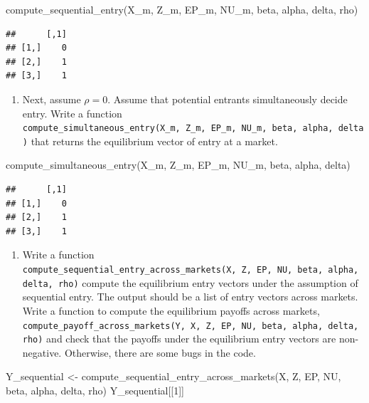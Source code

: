 \documentclass[
]{book}
\newenvironment{Shaded}{\begin{snugshade}}{\end{snugshade}}
\newcommand{\DecValTok}[1]{\textcolor[rgb]{0.00,0.00,0.81}{#1}}
\newcommand{\FunctionTok}[1]{\textcolor[rgb]{0.00,0.00,0.00}{#1}}
\newcommand{\NormalTok}[1]{#1}
\newcommand{\OtherTok}[1]{\textcolor[rgb]{0.56,0.35,0.01}{#1}}
\providecommand{\tightlist}{%
  \setlength{\itemsep}{0pt}\setlength{\parskip}{0pt}}
\begin{document}
\begin{Shaded}
\begin{Highlighting}[]
\FunctionTok{compute\_sequential\_entry}\NormalTok{(X\_m, Z\_m, EP\_m, NU\_m, beta, alpha, delta, rho)}
\end{Highlighting}
\end{Shaded}

\begin{verbatim}
##      [,1]
## [1,]    0
## [2,]    1
## [3,]    1
\end{verbatim}

\begin{enumerate}
\def\labelenumi{\arabic{enumi}.}
\setcounter{enumi}{5}
\tightlist
\item
  Next, assume \(\rho = 0\). Assume that potential entrants simultaneously decide entry. Write a function \texttt{compute\_simultaneous\_entry(X\_m,\ Z\_m,\ EP\_m,\ NU\_m,\ beta,\ alpha,\ delta)} that returns the equilibrium vector of entry at a market.
\end{enumerate}

\begin{Shaded}
\begin{Highlighting}[]
\FunctionTok{compute\_simultaneous\_entry}\NormalTok{(X\_m, Z\_m, EP\_m, NU\_m, beta, alpha, delta)}
\end{Highlighting}
\end{Shaded}

\begin{verbatim}
##      [,1]
## [1,]    0
## [2,]    1
## [3,]    1
\end{verbatim}

\begin{enumerate}
\def\labelenumi{\arabic{enumi}.}
\setcounter{enumi}{6}
\tightlist
\item
  Write a function \texttt{compute\_sequential\_entry\_across\_markets(X,\ Z,\ EP,\ NU,\ beta,\ alpha,\ delta,\ rho)} compute the equilibrium entry vectors under the assumption of sequential entry. The output should be a list of entry vectors across markets. Write a function to compute the equilibrium payoffs across markets, \texttt{compute\_payoff\_across\_markets(Y,\ X,\ Z,\ EP,\ NU,\ beta,\ alpha,\ delta,\ rho)} and check that the payoffs under the equilibrium entry vectors are non-negative. Otherwise, there are some bugs in the code.
\end{enumerate}

\begin{Shaded}
\begin{Highlighting}[]
\NormalTok{Y\_sequential }\OtherTok{\textless{}{-}}
  \FunctionTok{compute\_sequential\_entry\_across\_markets}\NormalTok{(X, Z, EP, NU, beta, alpha, delta, rho)}
\NormalTok{Y\_sequential[[}\DecValTok{1}\NormalTok{]]}
\end{Highlighting}
\end{Shaded}
\end{document}
